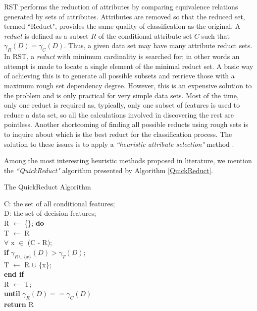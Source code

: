 \documentclass{llncs}
\begin{document}
RST performs the reduction of attributes by comparing equivalence relations generated by sets of attributes. Attributes are removed so that the reduced set, termed ``Reduct", provides the same quality of classification as the original. A \emph{reduct} is defined as a subset $R$ of the conditional attribute set $C$ such that $\gamma_{R}(D) = \gamma_{C}(D)$. Thus, a given data set may have many attribute reduct sets. In RST, a \emph{reduct} with minimum cardinality is searched for; in other words an attempt is made to locate a single element of the minimal reduct set. A basic way of achieving this is to generate all possible subsets and retrieve those with a maximum rough set dependency degree. However, this is an expensive solution to the problem and is only practical for very simple data sets. Most of the time, only one reduct is required as, typically, only one subset of features is used to reduce a data set, so all the calculations involved in discovering the rest are pointless. Another shortcoming of finding all possible reducts using rough sets is to inquire about which is the best reduct for the classification process.  The solution to these issues is to apply a \emph{``heuristic attribute selection"} method \cite{zhong2001using}.

Among the most interesting heuristic methods proposed in literature, we mention the \emph{``QuickReduct"} algorithm \cite{shen2007rough} presented by Algorithm \ref{QuickReduct}.

\begin{algorithm}[!h]
\caption{The QuickReduct Algorithm} \label{QuickReduct}
\begin{algorithmic}[1]
\STATE C: the set of all conditional features;\\
\STATE D: the set of decision features;\\
\STATE R $\leftarrow$ \{\};
\STATE \textbf{do} \\
\STATE \hspace{0.24cm} T $\leftarrow$ R\\
 \STATE \hspace{0.24cm} $\forall$ x $\in$ (C - R);\\
 \STATE \hspace{0.28cm} \textbf{if} $\gamma_{R \cup \{x\}}(D) > \gamma_T(D)$;\\
  \STATE \hspace{0.35cm} T $\leftarrow$ R $\cup$ \{x\};\\
  \STATE \hspace{0.28cm} \textbf{end if} \\
  \STATE \hspace{0.24cm} R $\leftarrow$ T;\\
  \STATE \textbf{until} $\gamma_R(D) == \gamma_C(D)$\\
  \STATE \textbf{return} R
\end{algorithmic}
\end{algorithm}
\end{document}
